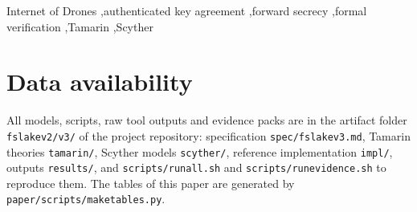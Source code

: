 \documentclass[a4paper,fleqn]{\casclass}
\makeatletter
\DeclareRobustCommand{\_}{\ifmmode\nfss@text{\textunderscore}\else\textunderscore\allowbreak\fi}
\makeatother
\begin{document}


\begin{keywords}
Internet of Drones \sep authenticated key agreement \sep forward secrecy \sep formal verification \sep Tamarin \sep Scyther
\end{keywords}

\maketitle












\section*{Data availability}
All models, scripts, raw tool outputs and evidence packs are in the artifact folder \texttt{fsl\_ake\_v2/v3/} of the
project repository: specification \texttt{spec/fsl\_ake\_v3.md}, Tamarin theories \texttt{tamarin/}, Scyther models
\texttt{scyther/}, reference implementation \texttt{impl/}, outputs \texttt{results/}, and \texttt{scripts/run\_all.sh} and
\texttt{scripts/run\_evidence.sh} to reproduce them. The tables of this paper are generated by
\texttt{paper/scripts/make\_tables.py}.


\FloatBarrier


\end{document}
